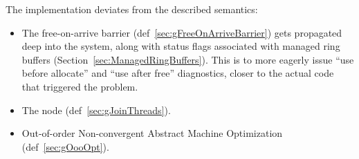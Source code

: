 

The implementation deviates from the described semantics:

\begin{itemize}
  \item The free-on-arrive barrier (def~\ref{sec:gFreeOnArriveBarrier}) gets propagated deep into the system, along with status flags associated with managed ring buffers (Section~\ref{sec:ManagedRingBuffers}).
  This is to more eagerly issue ``use before allocate'' and ``use after free'' diagnostics, closer to the actual code that triggered the problem.
  \item The  node (def~\ref{sec:gJoinThreads}).
  \item Out-of-order Non-convergent Abstract Machine Optimization (def~\ref{sec:gOooOpt}).
\end{itemize}
